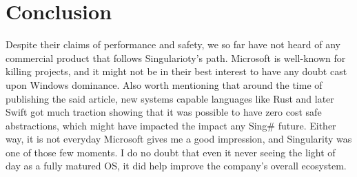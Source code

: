 \documentclass[12pt]{article}
\begin{document}
\section{Conclusion}
Despite their claims of performance and safety, we so far have not heard of any commercial product that follows Singularioty's path. Microsoft is well-known for killing projects, and it might not be in their best interest to have any doubt cast upon Windows dominance. Also worth mentioning that around the time of publishing the said article, new systems capable languages like Rust\cite{matsakis2014rust} and later Swift\cite{goodwill2015swift} got much traction showing that it was possible to have zero cost safe abstractions, which might have impacted the impact any Sing# future. Either way, it is not everyday Microsoft gives me a good impression, and Singularity was one of those few moments. I do no doubt that even it never seeing the light of day as a fully matured OS, it did help improve the company's overall ecosystem.



\end{document}
